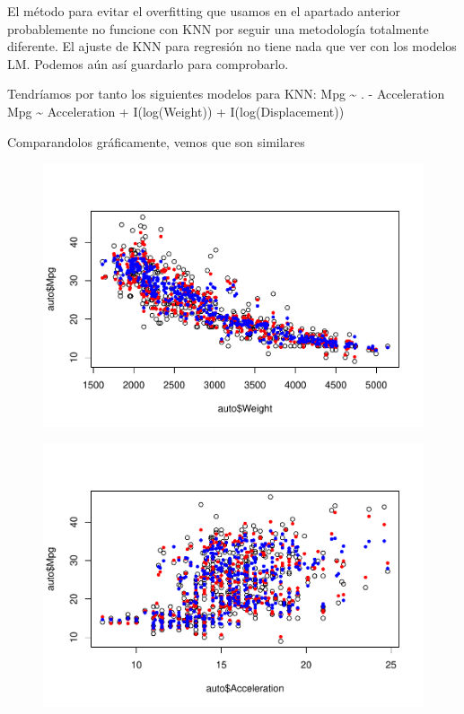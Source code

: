 El método para evitar el overfitting que usamos en el apartado anterior probablemente no funcione con KNN por seguir una metodología totalmente diferente. El ajuste de KNN para regresión no tiene nada que ver con los modelos LM. Podemos aún así guardarlo para comprobarlo.

Tendríamos por tanto los siguientes modelos para KNN: Mpg \textasciitilde{} . - Acceleration Mpg \textasciitilde{} Acceleration + I(log(Weight)) + I(log(Displacement))

Comparandolos gráficamente, vemos que son similares

\begin{figure}[H]\includegraphics[width=.9\linewidth]{img/Regresion_files/figure-latex/unnamed-chunk-33-1} \caption{}\end{figure}

\begin{figure}[H]\includegraphics[width=.9\linewidth]{img/Regresion_files/figure-latex/unnamed-chunk-33-2} \caption{}\end{figure}

